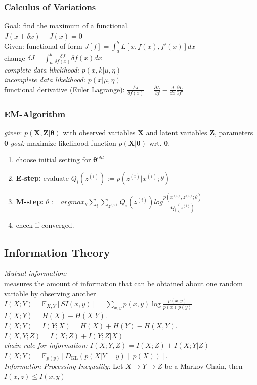 \documentclass[9pt,parskip]{scrartcl}
\begin{document}
\begin{multicols*}{4}
\subsubsection*{Calculus of Variations}
Goal: find the maximum of a functional. \\
$J(x + \delta x) - J(x) = 0$ \\
Given: functional of form 
$J[f]=\int _{a}^{b} L[x,f(x),f'(x)] dx $ \\
change $\delta J = \int_a^b  \frac{\delta J}{\delta f(x)} \delta f(x) dx $ \\
\textit{complete data likelihood:} $p(x,k|\mu, \eta)$\\
\textit{incomplete data likelihood:} $p(x|\mu, \eta)$\\
functional derivative (Euler Lagrange): $\frac{\delta J}{\delta f(x)} = \frac{\partial L}{\partial f} -\frac{d}{dx} \frac{\partial L}{\partial f'} $
\subsubsection*{EM-Algorithm}
\textit{given}: $p(\mathbf{X},\mathbf{Z}|\mathbf{\theta})$ with observed variables $\mathbf{X}$ and latent variables $\mathbf{Z}$, parameters $\mathbf{\theta}$
\textit{goal:} maximize likelihood function $p(\mathbf{X}|\mathbf{\theta})$ wrt. $\mathbf{\theta}$.
\begin{enumerate}
	\item choose initial setting for $\boldsymbol{\theta}^{old}$
	\item \textbf{E-step:} evaluate 
	$Q_i(z^{(i)}) := p(z^{(i)}|x^{(i)};\theta)$
	\item \textbf{M-step:} 
	$\theta := argmax_{\theta} \sum_i \sum_{z^{(i)}} Q_i(z^{(i)})log\frac{p(x^{(i)},z^{(i)};\theta)}{Q_i(z^{(i)})}$ 
	\item check if converged.
\end{enumerate}

\subsection*{Information Theory}
\textit{Mutual information: } \\
measures the amount of information that can be obtained about one random variable by observing another \\
$I(X;Y)=\mathbb {E} _{X,Y}[SI(x,y)]=\sum _{x,y}p(x,y)\log {\frac {p(x,y)}{p(x)\,p(y)}}$ \\
$I(X;Y)=H(X)-H(X|Y).\,$ \\
$I(X;Y)=I(Y;X)=H(X)+H(Y)-H(X,Y).\,$ \\
$I(X,Y;Z) = I(X;Z) + I(Y;Z|X)$\\
\textit{chain rule for information: }$I(X;Y,Z)=I(X;Z)+I(X;Y|Z)$ \\
$I(X;Y)=\mathbb {E} _{p(y)}[D_{\mathrm {KL} }(p(X|Y=y)\|p(X))].$ \\
\textit{Information Processing Inequality: } Let $X \rightarrow Y \rightarrow Z$ be a Markov Chain, then $I(x,z) \leq I(x,y)$

\end{multicols*}
\end{document}
